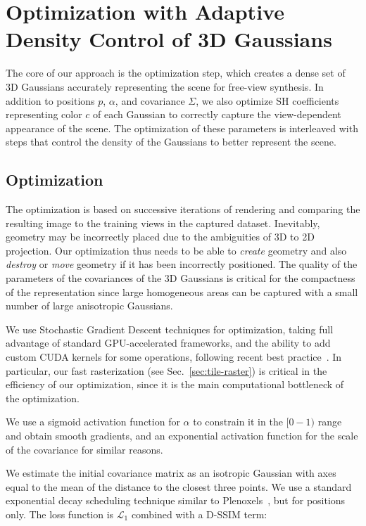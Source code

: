 \section{Optimization with Adaptive Density Control of 3D Gaussians}
\label{sec:opt-dens}


The core of our approach is the optimization step, which creates a dense set of 3D Gaussians accurately representing the scene for free-view synthesis.
In addition to positions $p$, $\alpha$, and covariance $\Sigma$, we also optimize SH coefficients representing color $c$ of each Gaussian to correctly capture the view-dependent appearance of the scene.
The optimization of these parameters is interleaved with steps that control the density of the Gaussians to better represent the scene.


\subsection{Optimization}

The optimization is based on successive iterations of rendering and comparing the resulting image to the training views in the captured dataset. Inevitably, geometry may be incorrectly placed due to the ambiguities of 3D to 2D projection. Our optimization thus needs to be able to \emph{create} geometry and also \emph{destroy} or \emph{move} geometry if it has been incorrectly positioned. The quality of the parameters of the covariances of the 3D Gaussians is critical for the compactness of the representation since large homogeneous areas can be captured with a small number of large anisotropic Gaussians.

We use Stochastic Gradient Descent techniques for optimization, taking full advantage of standard GPU-accelerated frameworks, and the ability to add custom CUDA kernels for some operations, following recent best practice~\cite{plenoxels,dvgo-cvpr2022}. In particular, our fast rasterization (see Sec.~\ref{sec:tile-raster}) is critical in the efficiency of our optimization, since it is the main computational bottleneck of the optimization.

We use a sigmoid activation function for $\alpha$ to constrain it in the $[0-1)$ range and obtain smooth gradients, and an exponential activation function for the scale of the covariance for similar reasons.




We estimate the initial covariance matrix as an isotropic Gaussian with axes
equal to the mean of the distance to the closest three points.
We use a standard exponential decay scheduling technique similar to Plenoxels~\cite{plenoxels}, but for positions only. The loss function is $\mathcal{L}_1$ combined with a D-SSIM term:


